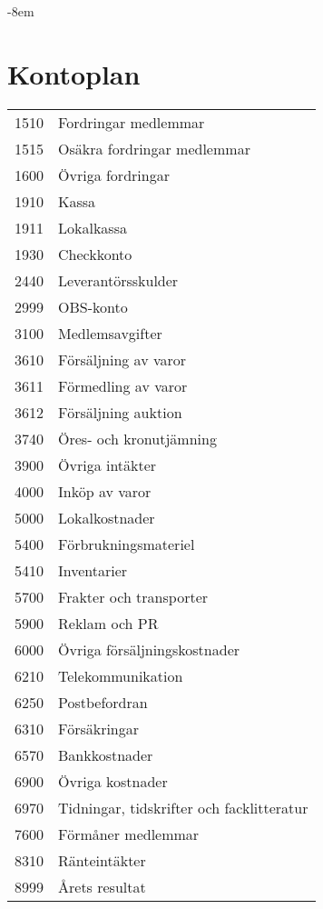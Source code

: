 
		
		\begin{adjustwidth}{}{-8em}
			\section{Kontoplan}
			\label{sec:bilaga:kontoplan}
			\begin{xtabular}[l]{l l}
				1510 & Fordringar medlemmar \\
				1515 & Osäkra fordringar medlemmar \\
				1600 & Övriga fordringar \\
				1910 & Kassa \\
				1911 & Lokalkassa \\
				1930 & Checkkonto \\
				2440 & Leverantörsskulder \\
				2999 & OBS-konto \\
				3100 & Medlemsavgifter \\
				3610 & Försäljning av varor \\
				3611 & Förmedling av varor \\
				3612 & Försäljning auktion \\
				3740 & Öres- och kronutjämning \\
				3900 & Övriga intäkter \\
				4000 & Inköp av varor \\
				5000 & Lokalkostnader \\
				5400 & Förbrukningsmateriel \\
				5410 & Inventarier \\
				5700 & Frakter och transporter \\
				5900 & Reklam och PR \\
				6000 & Övriga försäljningskostnader \\
				6210 & Telekommunikation \\
				6250 & Postbefordran \\
				6310 & Försäkringar \\
				6570 & Bankkostnader \\
				6900 & Övriga kostnader \\
				6970 & Tidningar, tidskrifter och facklitteratur \\
				7600 & Förmåner medlemmar \\
				8310 & Ränteintäkter \\
				8999 & Årets resultat \\
				
			\end{xtabular}
		\end{adjustwidth}

		
